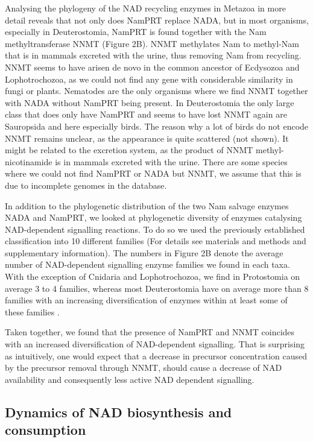 \documentclass[paper=a4, 12pt]{scrartcl}
\begin{document}
Analysing the phylogeny of the NAD recycling enzymes in Metazoa in more detail reveals that not only does NamPRT replace NADA, but in most organisms, especially in Deuterostomia, NamPRT is found together with the Nam methyltransferase NNMT (Figure 2B). NNMT methylates Nam to methyl-Nam that is in mammals excreted with the urine, thus removing Nam from recycling. NNMT seems to have arisen de novo in the common ancestor of Ecdysozoa and Lophotrochozoa, as we could not find any gene with considerable similarity in fungi or plants. Nematodes are the only organisms where we find NNMT together with NADA without NamPRT being present. In Deuterostomia the only large class that does only have NamPRT and seems to have lost NNMT again are Sauropsida and here especially birds. The reason why a lot of birds do not encode NNMT remains unclear, as the appearance is quite scattered (not shown). It might be related to the excretion system, as the product of NNMT methyl-nicotinamide is in mammals excreted with the urine. There are some species where we could not find NamPRT or NADA but NNMT, we assume that this is due to incomplete genomes in the database.

In addition to the phylogenetic distribution of the two Nam salvage enzymes NADA and NamPRT, we looked at phylogenetic diversity of enzymes catalysing NAD-dependent signalling reactions. To do so we used the previously established classification into 10 different families \cite{Gossmann2012} (For details see materials and methods and supplementary information). The numbers in Figure 2B denote the average number of NAD-dependent signalling enzyme families we found in each taxa. With the exception of Cnidaria and Lophotrochozoa, we find in Protostomia on average 3 to 4 families, whereas most Deuterostomia have on average more than 8 families with an increasing diversification of enzymes within at least some of these families \cite{Gossmann2014}.

Taken together, we found that the presence of NamPRT and NNMT coincides with an increased diversification of NAD-dependent signalling. That is surprising as intuitively, one would expect that a decrease in precursor concentration caused by the precursor removal through NNMT, should cause a decrease of NAD availability and consequently less active NAD dependent signalling.


\subsection{Dynamics of NAD biosynthesis and consumption}
\end{document}
